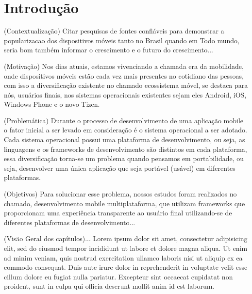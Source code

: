 \chapter{Introdução} %
(Contextualização) Citar pesquisas de fontes confiáveis para demonstrar a
popularizacao dos dispositivos móveis tanto no Brasil quando em Todo mundo,
seria bom também informar o crescimento e o futuro do crescimento...

(Motivação) Nos dias atuais, estamos vivenciando a chamada era da mobilidade, onde dispositivos
móveis estão cada vez mais presentes no cotidiano das pessoas, com isso a
diversificação existente no chamado ecossistema móvel, se destaca para nós,
usuários finais, nos sistemas operacionais existentes sejam eles Android, iOS,
Windows Phone e o novo Tizen.

(Problemática) Durante o processo de desenvolvimento de uma aplicação mobile o
fator inicial a ser levado em consideração é o sistema operacional a ser adotado.
Cada sistema operacional possui uma plataforma de desenvolvimento, ou seja, as
linguagens e os frameworks de desenvolvimento são distintos em cada plataforma,
essa diversificação torna-se um problema quando pensamos em portabilidade,
ou seja, desenvolver uma única aplicação que seja portável (usável) em
diferentes plataformas.

(Objetivos) Para solucionar esse problema, nossos estudos foram realizados no
chamado, desenvolvimento mobile multiplataforma, que utilizam frameworks que
proporcionam uma experiência transparente ao usuário final utilizando-se de
diferentes plataformas de desenvolvimento...

(Visão Geral dos capítulos)...
Lorem ipsum dolor sit amet, consectetur adipisicing elit, sed do eiusmod
tempor incididunt ut labore et dolore magna aliqua. Ut enim ad minim veniam,
quis nostrud exercitation ullamco laboris nisi ut aliquip ex ea commodo
consequat. Duis aute irure dolor in reprehenderit in voluptate velit esse
cillum dolore eu fugiat nulla pariatur. Excepteur sint occaecat cupidatat non
proident, sunt in culpa qui officia deserunt mollit anim id est laborum.

